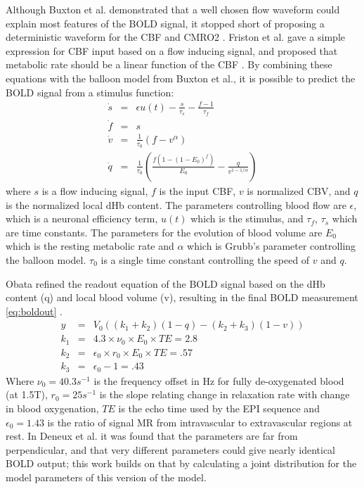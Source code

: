 \documentclass{article}
\begin{document}
Although Buxton et al. demonstrated that a well chosen flow waveform could 
explain most features of the \ac{BOLD} signal, it stopped short of proposing a
deterministic waveform for the \ac{CBF} and \ac{CMRO2} \cite{Buxton1998}. Friston et al. 
gave a simple expression for \ac{CBF} input based on a flow inducing signal,
and proposed that metabolic rate should be a linear function of the \ac{CBF} \cite{Friston2000}.
By combining these equations with the balloon model from Buxton et al.,
it is possible to predict the \ac{BOLD} signal from a stimulus function:
\begin{eqnarray}
\label{eq:bold1}
\dot{s} &=& \epsilon u(t) - \frac{s}{\tau_s} - \frac{f - 1}{\tau_f} \\
\label{eq:bold2}
\dot{f} &=& s\\
\label{eq:bold3}
\dot{v} &=& \frac{1}{\tau_0}(f - v^\alpha)\\
\label{eq:bold4}
\dot{q} &=& \frac{1}{\tau_0}(\frac{f(1-(1-E_0)^f)}{E_0} - \frac{q}{v^{1-1/\alpha}})
\end{eqnarray}
where $s$ is a flow inducing signal, $f$ is the input \ac{CBF},
$v$ is normalized \ac{CBV}, and $q$ is the normalized
local \ac{dHb} content. The 
parameters controlling blood flow are $\epsilon$, which is a neuronal 
efficiency term, $u(t)$ which is the stimulus, and $\tau_f$, $\tau_s$ 
which are time constants. The parameters for the evolution of blood 
volume are $E_0$ which is the resting metabolic
rate and $\alpha$ which is Grubb's parameter controlling the balloon model. 
$\tau_0$ is a single time constant controlling the speed of $v$ and $q$.

Obata refined the readout equation 
of the \ac{BOLD} signal based on the
\ac{dHb} content (q) and local blood volume (v), resulting in the
final \ac{BOLD} measurement \autoref{eq:boldout} \cite{Obata2004}.
\begin{eqnarray}
\label{eq:boldout}
y   &=& V_0((k_1 + k_2)(1-q) - (k_2 + k_3)(1-v))\\
k_1 &=& 4.3 \times \nu_0 \times E_0 \times TE = 2.8 \nonumber\\
k_2 &=& \epsilon_0 \times r_0 \times E_0 \times TE = .57 \nonumber \\
k_3 &=& \epsilon_0 - 1 = .43 \nonumber
\end{eqnarray}
Where $\nu_0 = 40.3 s^{-1}$  is the frequency offset in Hz for fully
de-oxygenated blood (at 1.5T), $r_0 = 25 s^{-1}$  is the slope relating
change in relaxation rate with change in blood oxygenation, $TE$ is the
echo time used by the \ac{EPI} sequence and $\epsilon_0 = 1.43$ is the 
ratio of signal \ac{MR} from intravascular to extravascular regions at rest. 
In Deneux et al. \cite{Deneux2006} it was found that the parameters are far from perpendicular,
and that very different parameters could give nearly identical \ac{BOLD} output;
this work builds on that by calculating a joint distribution for the
model parameters of this version of the model. 
\end{document}

